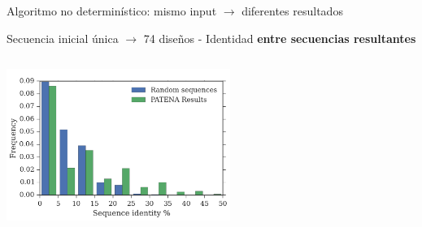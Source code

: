 \documentclass{beamer}
\begin{document}
% 
% 


\begin{frame}[plain]{{\small Algoritmo no determinístico: mismo input $\rightarrow$ diferentes resultados}}
\centering
\vspace{10px}
\begin{adjustwidth}{-2.5em}{-2.5em}
\begin{center}
\begin{adjustbox}{width=\textwidth}
Secuencia inicial única $\rightarrow$ 74 diseños - Identidad \textbf{entre secuencias resultantes}
\end{adjustbox}
\end{center} 
\end{adjustwidth}
\hspace{10px} 
\includegraphics[width=275px,height=215px]{../img/againstAll-random.png}
\end{frame}
\end{document}
